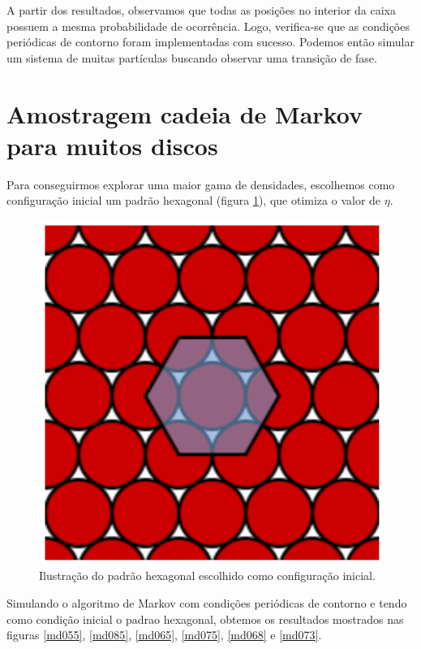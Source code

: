 \documentclass[%
reprint,
amsmath,amssymb,
aps,
12pt
]{revtex4-1}
\begin{document}
A partir dos resultados, observamos que todas as posições no interior da caixa possuem a mesma probabilidade de ocorrência. Logo, verifica-se que as condições periódicas de contorno foram implementadas com sucesso. Podemos então simular um sistema de muitas partículas buscando observar uma transição de fase.

\section{Amostragem cadeia de Markov para muitos discos}

Para conseguirmos explorar uma maior gama de densidades, escolhemos como configuração inicial um padrão hexagonal (figura \ref{ph}), que otimiza o valor de $ \eta $.

\begin{figure}[!h]
	\centering
	\includegraphics[scale=0.4]{ph1.png}
	\caption{Ilustração do padrão hexagonal escolhido como configuração inicial.
	\label{ph}}
\end{figure}

\newpage

Simulando o algoritmo de Markov com condições periódicas de contorno e tendo como condição inicial o padrao hexagonal, obtemos os resultados mostrados nas figuras \ref*{md055}, \ref*{md085}, \ref*{md065}, \ref*{md075}, \ref*{md068} e \ref*{md073}.
\end{document}
